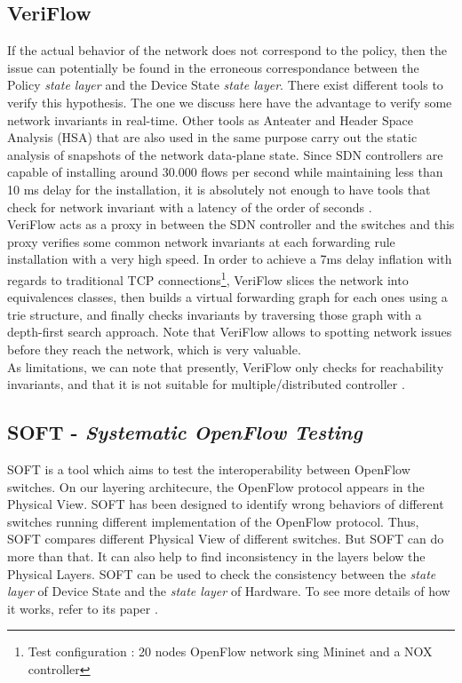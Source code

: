 \documentclass[10pt,article]{IEEEtran}
\begin{document}
\subsection{VeriFlow}
If the actual behavior of the network does not correspond to the policy, then the issue can potentially be found in the erroneous correspondance between the Policy \textit{state layer} and the Device State \textit{state layer}. There exist different tools to verify this hypothesis. The one we discuss here have the advantage to verify some network invariants in real-time. Other tools as Anteater and Header Space Analysis (HSA) that are also used in the same purpose carry out the static analysis of snapshots of the network data-plane state\cite{Kazemian:2012:HSA:2228298.2228311}\cite{Mai:2011:DDP:2018436.2018470}. Since SDN controllers are capable of installing around 30.000 flows per second while maintaining less than 10 ms delay for the installation, it is absolutely not enough to have tools that check for network invariant with a latency of the order of seconds \cite{Khurshid:2013:VVN:2482626.2482630}.\\
VeriFlow acts as a proxy in between the SDN controller and the switches and this proxy verifies some common network invariants at each forwarding rule installation with a very high speed. In order to achieve a 7ms delay inflation with regards to traditional TCP connections\footnote{Test configuration : 20 nodes OpenFlow network sing Mininet and a NOX controller\cite{Khurshid:2013:VVN:2482626.2482630} }, VeriFlow slices the network into equivalences classes, then builds a virtual forwarding graph for each ones using a trie structure, and finally checks invariants by traversing those graph with a depth-first search approach. Note that VeriFlow allows to spotting network issues before they reach the network, which is very valuable.\\
As limitations, we can note that presently, VeriFlow only checks for reachability invariants, and that it is not suitable for multiple/distributed controller \cite{Khurshid:2013:VVN:2482626.2482630}.

\subsection{SOFT - \textit{Systematic OpenFlow Testing}}
SOFT is a tool which aims to test the interoperability between OpenFlow switches. On our layering architecure, the OpenFlow protocol appears in the Physical View. SOFT has been designed to identify wrong behaviors of different switches running different implementation of the OpenFlow protocol. Thus, SOFT compares different Physical View of different switches. But SOFT can do more than that. It can also help to find inconsistency in the layers below the Physical Layers. SOFT can be used to check the consistency between the \textit{state layer} of Device State and the \textit{state layer} of Hardware. To see more details of how it works, refer to its paper \cite{SOFT}.
\end{document}

